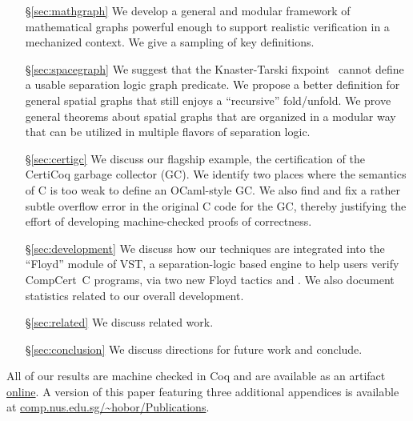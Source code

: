 \begin{itemize}
\item[\S\ref{sec:mathgraph}] We develop a general and modular framework of mathematical graphs powerful enough to support realistic verification in a mechanized context.  We give a sampling of key definitions.
\item[\S\ref{sec:spacegraph}] We suggest that the Knaster-Tarski fixpoint~\cite{tarski:fixpoint} cannot define a usable separation logic graph predicate.  We propose a better definition for general spatial graphs that still enjoys a ``recursive'' fold/unfold.  We prove general theorems about spatial graphs that are 
organized in a modular way that can be utilized in multiple flavors of separation logic. %
\item[\S\ref{sec:certigc}] We discuss our flagship example, the certification of the CertiCoq garbage collector (GC). We identify two places where the semantics of C is too weak to define an OCaml-style GC. We also find and fix a rather subtle overflow error in the original C code for the GC, thereby justifying the effort of developing machine-checked proofs of correctness.
\item[\S\ref{sec:development}] We discuss how our techniques are integrated into the
``Floyd'' module of VST, a separation-logic based engine to help users verify
CompCert~C programs, via two new Floyd tactics  and .
We also document statistics related to our overall development.
\item[\S\ref{sec:related}] We discuss related work.
\item[\S\ref{sec:conclusion}] We discuss directions for future work and conclude.
\end{itemize}
All of our results are machine checked in Coq and are available as an artifact 
\href{https://zenodo.org/record/3368779}{online}.
A version of this paper featuring three additional appendices is available 
at \href{https://www.comp.nus.edu.sg/~hobor/Publications/2019/autoquack_extended_oopsla19.pdf}{comp.nus.edu.sg/\textasciitilde{}hobor/Publications}.
